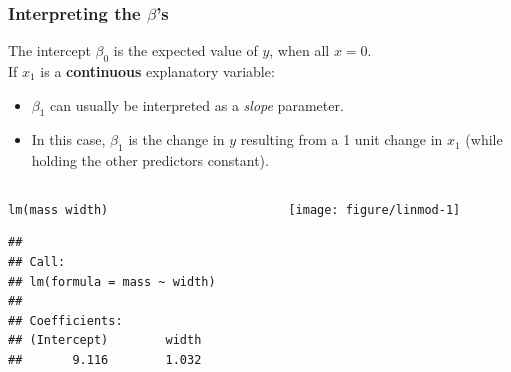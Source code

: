\documentclass[color=usenames,dvipsnames]{beamer}\usepackage[]{graphicx}\usepackage[]{xcolor}
\makeatletter
\newcommand{\hlopt}[1]{\textcolor[rgb]{0,0,0}{#1}}%
\newcommand{\hlstd}[1]{\textcolor[rgb]{0,0,0}{#1}}%
\newcommand{\hlkwd}[1]{\textcolor[rgb]{0.004,0.004,0.506}{#1}}%
\newenvironment{kframe}{%
 \def\at@end@of@kframe{}%
 \ifinner\ifhmode%
  \def\at@end@of@kframe{\end{minipage}}%
  \begin{minipage}{\columnwidth}%
 \fi\fi%
 \def\FrameCommand##1{\hskip\@totalleftmargin \hskip-\fboxsep
 \colorbox{shadecolor}{##1}\hskip-\fboxsep
     \hskip-\linewidth \hskip-\@totalleftmargin \hskip\columnwidth}%
 \MakeFramed {\advance\hsize-\width
   \@totalleftmargin\z@ \linewidth\hsize
   \@setminipage}}%
 {\par\unskip\endMakeFramed%
 \at@end@of@kframe}
\newenvironment{knitrout}{}{} %
\makeatother
\begin{document}
\begin{frame}[fragile]
  \frametitle{Interpreting the $\beta$'s}
  \small 
  The intercept $\beta_0$ is the expected value of $y$, when all $x=0$. \\
  \pause
  \vfill
  If $x_1$ is a {\bf continuous} explanatory variable: %
  \begin{itemize}
    \item $\beta_1$ can usually be interpreted as a \textit{slope}
      parameter.
    \item In this case, $\beta_1$ is the
      change in $y$ resulting from a 1 unit change in $x_1$ (while
      holding the other predictors constant).
  \end{itemize}
\pause
\vfill

\centering
\begin{columns}
  \begin{column}{0.5\textwidth}
\begin{knitrout}\tiny
{}\color{fgcolor}\begin{kframe}
\begin{alltt}
\hlkwd{lm}\hlstd{(mass}\hlopt{~}\hlstd{width)}
\end{alltt}
\begin{verbatim}
## 
## Call:
## lm(formula = mass ~ width)
## 
## Coefficients:
## (Intercept)        width  
##       9.116        1.032
\end{verbatim}
\end{kframe}
\end{knitrout}
  \end{column}
  \begin{column}{0.4\textwidth}
  \texttt{[image: figure/linmod-1]} \\
  \end{column}
\end{columns}
\end{frame}
\end{document}
